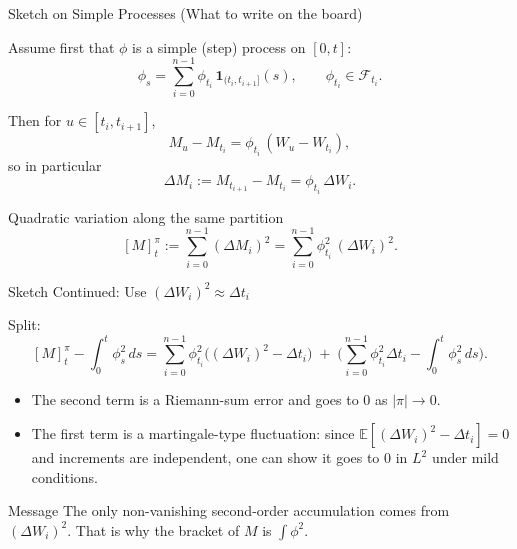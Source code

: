 \documentclass[10pt,aspectratio=169]{beamer}
\newcommand{\E}{\mathbb{E}}
\newcommand{\cF}{\mathcal{F}}
\begin{document}
\begin{frame}{Sketch on Simple Processes (What to write on the board)}

Assume first that $\phi$ is a simple (step) process on $[0,t]$:
\[
\phi_s=\sum_{i=0}^{n-1}\phi_{t_i}\,\mathbf{1}_{(t_i,t_{i+1}]}(s),
\qquad \phi_{t_i}\in\cF_{t_i}.
\]
\pause

Then for $u\in[t_i,t_{i+1}]$,
\[
M_u - M_{t_i} = \phi_{t_i}\,(W_u-W_{t_i}),
\]
so in particular
\[
\Delta M_i := M_{t_{i+1}}-M_{t_i} = \phi_{t_i}\,\Delta W_i.
\]
\pause

\begin{block}{Quadratic variation along the same partition}
\[
[M]^{\pi}_t
:=
\sum_{i=0}^{n-1}(\Delta M_i)^2
=
\sum_{i=0}^{n-1}\phi_{t_i}^2\,(\Delta W_i)^2.
\]
\end{block}

\end{frame}

\begin{frame}{Sketch Continued: Use $(\Delta W_i)^2 \approx \Delta t_i$}

Split:
\[
[M]^{\pi}_t - \int_0^t \phi_s^2\,ds
=
\sum_{i=0}^{n-1}\phi_{t_i}^2\Big((\Delta W_i)^2-\Delta t_i\Big)
\;+\;
\Big(\sum_{i=0}^{n-1}\phi_{t_i}^2\Delta t_i-\int_0^t \phi_s^2\,ds\Big).
\]
\pause

\begin{itemize}
  \item The second term is a Riemann-sum error and goes to $0$ as $|\pi|\to 0$.\pause
  \item The first term is a martingale-type fluctuation:
  since $\E[(\Delta W_i)^2-\Delta t_i]=0$ and increments are independent,
  one can show it goes to $0$ in $L^2$ under mild conditions.\pause
\end{itemize}

\medskip
\begin{alertblock}{Message}
The only non-vanishing second-order accumulation comes from $(\Delta W_i)^2$.
That is why the bracket of $M$ is $\int \phi^2$.
\end{alertblock}

\end{frame}
\end{document}
